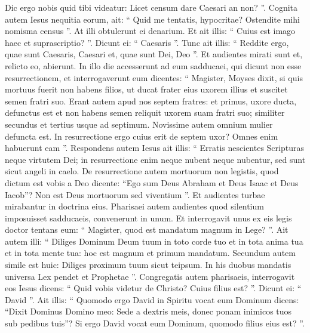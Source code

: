 \begin{biblechapter}
\begin{biblechapter}
\begin{biblechapter}
\begin{biblechapter}
\begin{biblechapter}
\begin{biblechapter}
\begin{biblechapter}
\begin{biblechapter}
\begin{biblechapter}
\begin{biblechapter}
\begin{biblechapter}
\begin{biblechapter}
\begin{biblechapter}
\begin{biblechapter}
\begin{biblechapter}
\begin{biblechapter}
\begin{biblechapter}
\begin{biblechapter}
\begin{biblechapter}
\begin{biblechapter}
\begin{biblechapter}
\begin{biblechapter}
\verse Dic ergo nobis quid tibi videatur: Licet censum dare Caesari an non? ”. 
\verse Cognita autem Iesus nequitia eorum, ait: “ Quid me tentatis, hypocritae? 
\verse Ostendite mihi nomisma census ”. At illi obtulerunt ei denarium. 
\verse Et ait illis: “ Cuius est imago haec et suprascriptio? ”. 
\verse Dicunt ei: “ Caesaris ”. Tunc ait illis: “ Reddite ergo, quae sunt Caesaris, Caesari et, quae sunt Dei, Deo ”. 
\verse Et audientes mirati sunt et, relicto eo, abierunt.
 \verse In illo die accesserunt ad eum sadducaei, qui dicunt non esse resurrectionem, et interrogaverunt eum 
\verse dicentes: “ Magister, Moyses dixit, si quis mortuus fuerit non habens filios, ut ducat frater eius uxorem illius et suscitet semen fratri suo. 
\verse Erant autem apud nos septem fratres: et primus, uxore ducta, defunctus est et non habens semen reliquit uxorem suam fratri suo; 
\verse similiter secundus et tertius usque ad septimum. 
\verse Novissime autem omnium mulier defuncta est. 
\verse In resurrectione ergo cuius erit de septem uxor? Omnes enim habuerunt eam ”. 
\verse Respondens autem Iesus ait illis: “ Erratis nescientes Scripturas neque virtutem Dei; 
\verse in resurrectione enim neque nubent neque nubentur, sed sunt sicut angeli in caelo. 
\verse De resurrectione autem mortuorum non legistis, quod dictum est vobis a Deo dicente: 
\verse “Ego sum Deus Abraham et Deus Isaac et Deus Iacob”? Non est Deus mortuorum sed viventium ”. 
\verse Et audientes turbae mirabantur in doctrina eius.
 \verse Pharisaei autem audientes quod silentium imposuisset sadducaeis, convenerunt in unum. 
\verse Et interrogavit unus ex eis legis doctor tentans eum: 
\verse “ Magister, quod est mandatum magnum in Lege? ”. 
\verse Ait autem illi: “ Diliges Dominum Deum tuum in toto corde tuo et in tota anima tua et in tota mente tua: 
\verse hoc est magnum et primum mandatum. 
\verse Secundum autem simile est huic: Diliges proximum tuum sicut teipsum. 
\verse In his duobus mandatis universa Lex pendet et Prophetae ”. 
\verse Congregatis autem pharisaeis, interrogavit eos Iesus 
\verse dicens: “ Quid vobis videtur de Christo? Cuius filius est? ”. Dicunt ei: “ David ”. 
\verse Ait illis: “ Quomodo ergo David in Spiritu vocat eum Dominum dicens:
 \verse “Dixit Dominus Domino meo: Sede a dextris meis,
 donec ponam inimicos tuos sub pedibus tuis”?
 \verse Si ergo David vocat eum Dominum, quomodo filius eius est? ”. 

\end{biblechapter}
\end{biblechapter}
\end{biblechapter}
\end{biblechapter}
\end{biblechapter}
\end{biblechapter}
\end{biblechapter}
\end{biblechapter}
\end{biblechapter}
\end{biblechapter}
\end{biblechapter}
\end{biblechapter}
\end{biblechapter}
\end{biblechapter}
\end{biblechapter}
\end{biblechapter}
\end{biblechapter}
\end{biblechapter}
\end{biblechapter}
\end{biblechapter}
\end{biblechapter}
\end{biblechapter}
